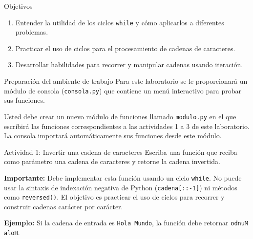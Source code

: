 \documentclass{ip-lab}
\begin{document}
\maketitle

\begin{sectionbox}{Objetivos}
\begin{enumerate}
    \item Entender la utilidad de los ciclos \texttt{while} y cómo aplicarlos a diferentes problemas.
    \item Practicar el uso de ciclos para el procesamiento de cadenas de caracteres.
    \item Desarrollar habilidades para recorrer y manipular cadenas usando iteración.
\end{enumerate}
\end{sectionbox}


\begin{sectionbox}{Preparación del ambiente de trabajo}
  Para este laboratorio se le proporcionará un módulo de consola (\texttt{consola.py}) que contiene un menú interactivo para probar sus funciones.
  
  Usted debe crear un nuevo módulo de funciones llamado \texttt{modulo.py} en el que escribirá las funciones correspondientes a las actividades 1 a 3 de este laboratorio. La consola importará automáticamente sus funciones desde este módulo.
\end{sectionbox}


\begin{sectionbox}{Actividad 1: Invertir una cadena de caracteres}
  Escriba una función que reciba como parámetro una cadena de caracteres y retorne la cadena invertida.

  \textbf{Importante:} Debe implementar esta función usando un ciclo \texttt{while}. No puede usar la sintaxis de indexación negativa de Python (\texttt{cadena[::-1]}) ni métodos como \texttt{reversed()}. El objetivo es practicar el uso de ciclos para recorrer y construir cadenas carácter por carácter.

  \textbf{Ejemplo:} Si la cadena de entrada es \texttt{\textquotedbl Hola Mundo\textquotedbl}, la función debe retornar \texttt{\textquotedbl odnuM aloH\textquotedbl}.
\end{sectionbox}
\end{document}
